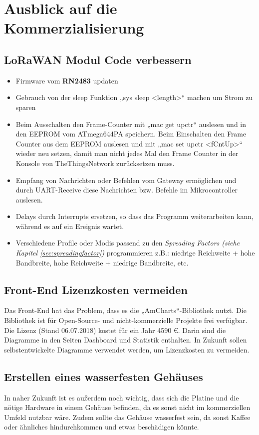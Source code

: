 \chapter{Ausblick auf die Kommerzialisierung}
\section{LoRaWAN Modul Code verbessern}
\begin{itemize}
    \item Firmware vom \textbf{RN2483} updaten
    \item Gebrauch von der sleep Funktion „sys sleep <length>“ machen um Strom zu sparen
    \item Beim Ausschalten den Frame-Counter mit „mac get upctr“ auslesen und in den EEPROM vom ATmega644PA speichern. Beim Einschalten den Frame Counter aus dem EEPROM auslesen und mit „mac set upctr <fCntUp>“ wieder neu setzen, damit man nicht jedes Mal den Frame Counter in der Konsole von TheThingsNetwork zurücksetzen muss. 
    \item Empfang von Nachrichten oder Befehlen vom Gateway ermöglichen und durch UART-Receive diese Nachrichten bzw. Befehle im Mikrocontroller auslesen. 
    \item Delays durch Interrupts ersetzen, so dass das Programm weiterarbeiten kann, während es auf ein Ereignis wartet.
    \item Verschiedene Profile oder Modis passend zu den \textit{Spreading Factors (siehe Kapitel \ref{sec:spreadingfactor})} programmieren z.B.: niedrige Reichweite + hohe Bandbreite, hohe Reichweite + niedrige Bandbreite, etc.
\end{itemize} 
\section{Front-End Lizenzkosten vermeiden}
Das Front-End hat das Problem, dass es die „AmCharts“-Bibliothek nutzt. Die Bibliothek ist für Open-Source- und nicht-kommerzielle Projekte frei verfügbar. Die Lizenz (Stand 06.07.2018) kostet für ein Jahr 4590 \euro. Darin sind die Diagramme in den Seiten Dashboard und Statistik enthalten. In Zukunft sollen selbstentwickelte Diagramme verwendet werden, um Lizenzkosten zu vermeiden.
\newpage
\section{Erstellen eines wasserfesten Gehäuses}
In naher Zukunft ist es außerdem noch wichtig, dass sich die Platine und die nötige Hardware in einem Gehäuse befinden, da es sonst nicht im kommerziellen Umfeld nutzbar wäre. Zudem sollte das Gehäuse wasserfest sein, da sonst Kaffee oder ähnliches hindurchkommen und etwas beschädigen könnte.\\

